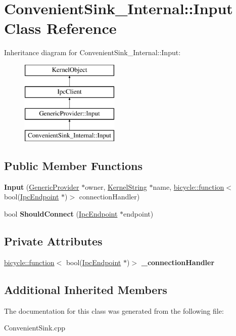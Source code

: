 \hypertarget{class_convenient_sink___internal_1_1_input}{}\section{Convenient\+Sink\+\_\+\+Internal\+:\+:Input Class Reference}
\label{class_convenient_sink___internal_1_1_input}
Inheritance diagram for Convenient\+Sink\+\_\+\+Internal\+:\+:Input\+:\begin{figure}[H]
\begin{center}
\leavevmode
\includegraphics[height=4.000000cm]{class_convenient_sink___internal_1_1_input}
\end{center}
\end{figure}
\subsection*{Public Member Functions}
\begin{DoxyCompactItemize}
\item 
\mbox{\label{class_convenient_sink___internal_1_1_input_a0d905e4ffc38d483d1a98ac335d1ba55}} 
{\bfseries Input} (\hyperlink{class_generic_provider}{Generic\+Provider} $\ast$owner, \hyperlink{class_kernel_string}{Kernel\+String} $\ast$name, \hyperlink{classbicycle_1_1function}{bicycle\+::function}$<$ bool(\hyperlink{class_ipc_endpoint}{Ipc\+Endpoint} $\ast$)$>$ connection\+Handler)
\item 
\mbox{\label{class_convenient_sink___internal_1_1_input_a031cd58b07adabd8e6f1741080215e94}} 
bool {\bfseries Should\+Connect} (\hyperlink{class_ipc_endpoint}{Ipc\+Endpoint} $\ast$endpoint)
\end{DoxyCompactItemize}
\subsection*{Private Attributes}
\begin{DoxyCompactItemize}
\item 
\mbox{\label{class_convenient_sink___internal_1_1_input_a233ca94cb4012e4e6b4aed6afd9aed6c}} 
\hyperlink{classbicycle_1_1function}{bicycle\+::function}$<$ bool(\hyperlink{class_ipc_endpoint}{Ipc\+Endpoint} $\ast$)$>$ {\bfseries \+\_\+connection\+Handler}
\end{DoxyCompactItemize}
\subsection*{Additional Inherited Members}


The documentation for this class was generated from the following file\+:\begin{DoxyCompactItemize}
\item 
Convenient\+Sink.\+cpp\end{DoxyCompactItemize}
